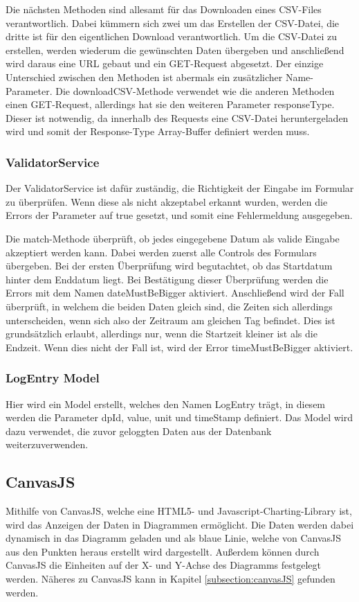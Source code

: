 Die nächsten Methoden sind allesamt für das Downloaden eines CSV-Files verantwortlich.
Dabei kümmern sich zwei um das Erstellen der CSV-Datei, die dritte ist für den eigentlichen Download verantwortlich. Um die CSV-Datei zu erstellen, werden wiederum die gewünschten Daten übergeben und anschließend wird daraus eine URL gebaut und ein GET-Request abgesetzt. Der einzige Unterschied zwischen den Methoden ist abermals ein zusätzlicher Name-Parameter. Die downloadCSV-Methode verwendet wie die anderen Methoden einen GET-Request, allerdings hat sie den weiteren Parameter responseType. Dieser ist notwendig, da innerhalb des Requests eine CSV-Datei heruntergeladen wird und somit der Response-Type Array-Buffer definiert werden muss.
 
\subsubsection{ValidatorService}
Der ValidatorService ist dafür zuständig, die Richtigkeit der Eingabe im Formular zu überprüfen. Wenn diese als nicht akzeptabel erkannt wurden, werden die Errors der Parameter auf true gesetzt, und somit eine Fehlermeldung ausgegeben.
 
Die match-Methode überprüft, ob jedes eingegebene Datum als valide Eingabe akzeptiert werden kann. Dabei werden zuerst alle Controls des Formulars übergeben. Bei der ersten Überprüfung wird begutachtet, ob das Startdatum hinter dem Enddatum liegt. Bei Bestätigung dieser Überprüfung werden die Errors mit dem Namen dateMustBeBigger aktiviert. Anschließend wird der Fall überprüft, in welchem die beiden Daten gleich sind, die Zeiten sich allerdings unterscheiden, wenn sich also der Zeitraum am gleichen Tag befindet. Dies ist grundsätzlich erlaubt, allerdings nur, wenn die Startzeit kleiner ist als die Endzeit. Wenn dies nicht der Fall ist, wird der Error timeMustBeBigger aktiviert.
 
\subsubsection{LogEntry Model}
Hier wird ein Model erstellt, welches den Namen LogEntry trägt, in diesem werden die Parameter dpId, value, unit und timeStamp definiert. Das Model wird dazu verwendet, die zuvor geloggten Daten aus der Datenbank weiterzuverwenden.
 
\subsection{CanvasJS}
Mithilfe von CanvasJS, welche eine HTML5- und Javascript-Charting-Library ist, wird das Anzeigen der Daten in Diagrammen ermöglicht. Die Daten werden dabei dynamisch in das Diagramm geladen und als blaue Linie, welche von CanvasJS aus den Punkten heraus erstellt wird dargestellt. Außerdem können durch CanvasJS die Einheiten auf der X- und Y-Achse des Diagramms festgelegt werden. Näheres zu CanvasJS kann in Kapitel \ref{subsection:canvasJS} gefunden werden.
